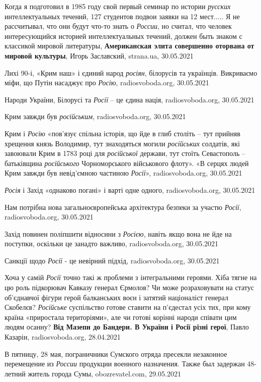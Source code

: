 Когда я подготовил в 1985 году свой первый семинар по истории \emph{русских}
интеллектуальных течений, 127 студентов подвои заявки на 12 мест.....  Я не
рассчитывал, что они будут что-то знать о \emph{России}, но считал, что человек
интересующийся историей интеллектуальных течений, должен быть знаком с
классикой мировой литературы, \textbf{Американская элита совершенно оторвана от
мировой культуры}, Игорь Заславский, strana.ua, 30.05.2021

Лихі 90-і, «Крим наш» і єдиний народ \emph{росіян}, білорусів та українців.
Викриваємо міфи, що Путін насаджує про \emph{Росію}, radiosvoboda.org,
30.05.2021

Народи України, Білорусі та \emph{Росії} – це єдина нація, radiosvoboda.org,
30.05.2021

Крим завжди був \emph{російським}, radiosvoboda.org, 30.05.2021

Крим і \emph{Росію} «пов'язує спільна історія, що йде в глиб століть – тут
прийняв хрещення князь Володимир, тут знаходяться могили \emph{російських}
солдатів, які завоювали Крим в 1783 році для \emph{російської} держави, тут
стоїть Севастополь – батьківщина \emph{російського} Чорноморського військового
флоту». «В серцях людей Крим завжди був невід'ємною частиною \emph{Росії}»,
radiosvoboda.org, 30.05.2021

\emph{Росія} і Захід «однаково погані» і варті одне одного, radiosvoboda.org, 30.05.2021

Нам потрібна нова загальноєвропейська архітектура безпеки за участю
\emph{Росії}, radiosvoboda.org, 30.05.2021

Захід повинен поліпшити відносини з \emph{Росією}, навіть якщо вона не йде на
поступки, оскільки це занадто важливо, radiosvoboda.org, 30.05.2021

Санкції щодо \emph{Росії} - це невірний підхід, radiosvoboda.org, 30.05.2021

Хоча у самій \emph{Росії} точно такі ж проблеми з інтегральними героями. Хіба
тягне на цю роль підкорювач Кавказу генерал Єрмолов? Чи може розраховувати на
статус об'єднавчої фігури герой балканських воєн і затятий націоналіст генерал
Скобелєв? \emph{Російське} суспільство готове ставити на п'єдестал усіх тих,
при кому країна «приростала територіями», але чи готові корінні народи співати
цим людям осанну? \textbf{Від Мазепи до Бандери. В України і Росії різні
герої}, Павло Казарін, radiosvoboda.org, 28.04.2021

В пятницу, 28 мая, пограничники Сумского отряда пресекли незаконное перемещение
из \emph{России} продукции военного назначения. Также был задержан 48-летний житель
города Сумы, obozrevatel.com, 29.05.2021

